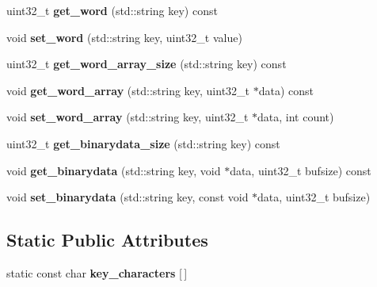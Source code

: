 \begin{DoxyCompactItemize}
\item 
\hypertarget{classRPCMsg_a3f39d4ae102e0b5382b1e55f3e433858}{
uint32\_\-t {\bfseries get\_\-word} (std::string key) const }
\label{classRPCMsg_a3f39d4ae102e0b5382b1e55f3e433858}

\item 
\hypertarget{classRPCMsg_ad14160d14e70dee21d2bfe32a4290fb1}{
void {\bfseries set\_\-word} (std::string key, uint32\_\-t value)}
\label{classRPCMsg_ad14160d14e70dee21d2bfe32a4290fb1}

\item 
\hypertarget{classRPCMsg_a78c552223e8bdcdda04b76880d355559}{
uint32\_\-t {\bfseries get\_\-word\_\-array\_\-size} (std::string key) const }
\label{classRPCMsg_a78c552223e8bdcdda04b76880d355559}

\item 
\hypertarget{classRPCMsg_a7cdd2ca4f627b66f4d9a8ffc0aedebd1}{
void {\bfseries get\_\-word\_\-array} (std::string key, uint32\_\-t $\ast$data) const }
\label{classRPCMsg_a7cdd2ca4f627b66f4d9a8ffc0aedebd1}

\item 
\hypertarget{classRPCMsg_a115637b04a870890c047e60744b2ba85}{
void {\bfseries set\_\-word\_\-array} (std::string key, uint32\_\-t $\ast$data, int count)}
\label{classRPCMsg_a115637b04a870890c047e60744b2ba85}

\item 
\hypertarget{classRPCMsg_ae62c8975d6799cfb7418d32dba09a645}{
uint32\_\-t {\bfseries get\_\-binarydata\_\-size} (std::string key) const }
\label{classRPCMsg_ae62c8975d6799cfb7418d32dba09a645}

\item 
\hypertarget{classRPCMsg_a641529b120373e58f7e35005fdb1684f}{
void {\bfseries get\_\-binarydata} (std::string key, void $\ast$data, uint32\_\-t bufsize) const }
\label{classRPCMsg_a641529b120373e58f7e35005fdb1684f}

\item 
\hypertarget{classRPCMsg_a3b5db033b6f85eb5a72096e17575d306}{
void {\bfseries set\_\-binarydata} (std::string key, const void $\ast$data, uint32\_\-t bufsize)}
\label{classRPCMsg_a3b5db033b6f85eb5a72096e17575d306}

\end{DoxyCompactItemize}
\subsection*{Static Public Attributes}
\begin{DoxyCompactItemize}
\item 
\hypertarget{classRPCMsg_ad3ed832bbb824a73227708b4cdbeb931}{
static const char {\bfseries key\_\-characters} \mbox{[}$\,$\mbox{]}}
\label{classRPCMsg_ad3ed832bbb824a73227708b4cdbeb931}

\end{DoxyCompactItemize}
